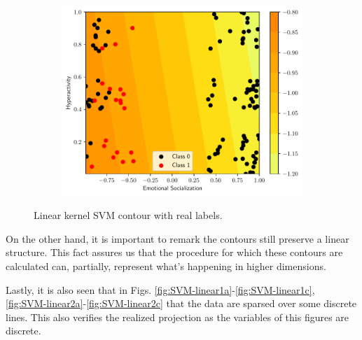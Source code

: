 \begin{figure}
\begin{subfigure}[b]{0.32\textwidth}
    \includegraphics[width=\textwidth]{figs/svm-linear-contour-2-5.pdf}
    \caption{}
  \end{subfigure}
  \caption{Linear kernel SVM contour with real labels.}
  \label{fig:SVM-linear}
\end{figure}

On the other hand, it is important to remark the contours still preserve a
linear structure. This fact assures us that the procedure for which these
contours are calculated can, partially, represent what's happening in higher
dimensions.

Lastly, it is also seen that in Figs.
\ref{fig:SVM-linear1a}-\ref{fig:SVM-linear1c},
\ref{fig:SVM-linear2a}-\ref{fig:SVM-linear2c} that the data are sparsed over
some discrete lines. This also verifies the realized projection as the variables
of this figures are discrete.

